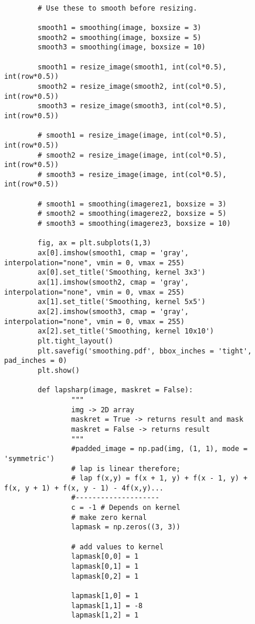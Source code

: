 {\begin{figure}[hbt!]
\begin{lstlisting}
        
        # Use these to smooth before resizing.
        
        smooth1 = smoothing(image, boxsize = 3)
        smooth2 = smoothing(image, boxsize = 5)
        smooth3 = smoothing(image, boxsize = 10)
        
        smooth1 = resize_image(smooth1, int(col*0.5), int(row*0.5))
        smooth2 = resize_image(smooth2, int(col*0.5), int(row*0.5))
        smooth3 = resize_image(smooth3, int(col*0.5), int(row*0.5))
        
        # smooth1 = resize_image(image, int(col*0.5), int(row*0.5))
        # smooth2 = resize_image(image, int(col*0.5), int(row*0.5))
        # smooth3 = resize_image(image, int(col*0.5), int(row*0.5))
        
        # smooth1 = smoothing(imagerez1, boxsize = 3)
        # smooth2 = smoothing(imagerez2, boxsize = 5)
        # smooth3 = smoothing(imagerez3, boxsize = 10)
        
        fig, ax = plt.subplots(1,3)
        ax[0].imshow(smooth1, cmap = 'gray', interpolation="none", vmin = 0, vmax = 255)
        ax[0].set_title('Smoothing, kernel 3x3')
        ax[1].imshow(smooth2, cmap = 'gray', interpolation="none", vmin = 0, vmax = 255)
        ax[1].set_title('Smoothing, kernel 5x5')
        ax[2].imshow(smooth3, cmap = 'gray', interpolation="none", vmin = 0, vmax = 255)
        ax[2].set_title('Smoothing, kernel 10x10')
        plt.tight_layout()
        plt.savefig('smoothing.pdf', bbox_inches = 'tight', pad_inches = 0)
        plt.show()
        
        def lapsharp(image, maskret = False):
                """
                img -> 2D array
                maskret = True -> returns result and mask
                maskret = False -> returns result
                """
                #padded_image = np.pad(img, (1, 1), mode = 'symmetric')
                # lap is linear therefore;
                # lap f(x,y) = f(x + 1, y) + f(x - 1, y) + f(x, y + 1) + f(x, y - 1) - 4f(x,y)...
                #--------------------
                c = -1 # Depends on kernel
                # make zero kernal
                lapmask = np.zeros((3, 3))
                
                # add values to kernel
                lapmask[0,0] = 1
                lapmask[0,1] = 1
                lapmask[0,2] = 1
        
                lapmask[1,0] = 1
                lapmask[1,1] = -8
                lapmask[1,2] = 1
        

\end{lstlisting}
\end{figure}}
